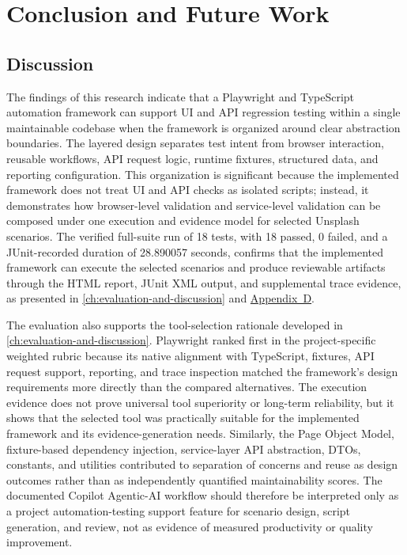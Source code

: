 \chapter{Conclusion and Future Work}
\label{ch:conclusion-and-future-work}
\begingroup
\sloppy
\setlength{\emergencystretch}{3em}

\section{Discussion}
\label{sec:ch6-discussion}

The findings of this research indicate that a Playwright and TypeScript automation framework can support UI and API regression testing within a single maintainable codebase when the framework is organized around clear abstraction boundaries. The layered design separates test intent from browser interaction, reusable workflows, API request logic, runtime fixtures, structured data, and reporting configuration. This organization is significant because the implemented framework does not treat UI and API checks as isolated scripts; instead, it demonstrates how browser-level validation and service-level validation can be composed under one execution and evidence model for selected Unsplash scenarios. The verified full-suite run of 18 tests, with 18 passed, 0 failed, and a JUnit-recorded duration of 28.890057 seconds, confirms that the implemented framework can execute the selected scenarios and produce reviewable artifacts through the HTML report, JUnit XML output, and supplemental trace evidence, as presented in \cref{ch:evaluation-and-discussion} and \hyperref[app:sample-reports]{Appendix~D}.

The evaluation also supports the tool-selection rationale developed in \cref{ch:evaluation-and-discussion}. Playwright ranked first in the project-specific weighted rubric because its native alignment with TypeScript, fixtures, API request support, reporting, and trace inspection matched the framework's design requirements more directly than the compared alternatives. The execution evidence does not prove universal tool superiority or long-term reliability, but it shows that the selected tool was practically suitable for the implemented framework and its evidence-generation needs. Similarly, the Page Object Model, fixture-based dependency injection, service-layer API abstraction, DTOs, constants, and utilities contributed to separation of concerns and reuse as design outcomes rather than as independently quantified maintainability scores. The documented Copilot Agentic-AI workflow should therefore be interpreted only as a project automation-testing support feature for scenario design, script generation, and review, not as evidence of measured productivity or quality improvement.

